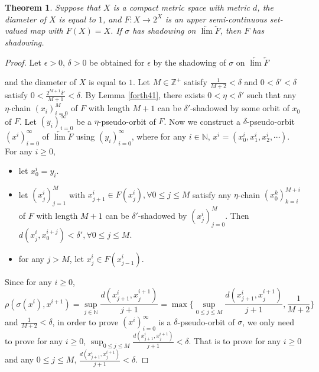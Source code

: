 \documentclass[12pt]{amsart}
\newtheorem{theorem}{Theorem}[section]
\theoremstyle{definition}
\begin{document}
\begin{theorem}\label{thm2}
	Suppose that $X$ is a compact metric space with metric $d$, the diameter of $X$ is equal to $1$, and $F:X\rightarrow 2^X$ is an upper semi-continuous set-valued map with $F(X)=X$. If $\sigma$ has shadowing on $\underleftarrow{\lim} \underleftarrow{F}$, then $F$ has shadowing.
\end{theorem}
\begin{proof}
	Let $\epsilon>0$, $\delta>0$ be obtained for $\epsilon$ by the shadowing of $\sigma$ on $\underleftarrow{\lim} \underleftarrow{F}$ {and the diameter of $X$ is equal to $1$. Let $M\in\mathbb{Z^+}$ satisfy $\frac{1}{M+2}<\delta$ and $0<\delta'<\delta$ satisfy $0<\frac{2^{M+1}\delta'}{M+1}<\delta$. By Lemma \ref{forth41}, there exists $0<\eta<\delta'$ such that any $\eta$-chain $(x_i)_{i=0}^M$ of $F$ with length $M+1$ can be $\delta'$-shadowed by some orbit of $x_0$ of $F$.
		Let $(y_i)_{i=0}^\infty$ be a $\eta$-pseudo-orbit of $F$. Now we construct a $\delta$-pseudo-orbit $(x^i)_{i=0}^\infty$ of $\underleftarrow{\lim} \underleftarrow{F}$ using $(y_i)_{i=0}^\infty$, where for any $i\in\mathbb{N}$, $x^i=(x^i_0, x^i_1, x^i_2, \cdots).$ For any $i\geq0$,
		\begin{itemize}
			\item [(1)]let $x_0^i=y_i$.
			\item [(2)]let $(x^i_j)_{j=1}^M$ with $x_{j+1}^i\in F(x_j^i),\forall 0\leq j\leq M$ satisfy any $\eta$-chain  $(x_{0}^k)_{k=i}^{M+i}$ of $F$ with length $M+1$ can be $\delta'$-shadowed by $(x_j^i)_{j=0}^M$. Then $d(x_j^i,x_0^{i+j})<\delta',\forall 0\leq j\leq M$.
			\item[(3)]for any $j>M$, let $x_j^i\in F(x_{j-1}^i)$. 
		\end{itemize}
		Since for any $i\geq 0$, $$\rho(\sigma(x^i),x^{i+1})=\sup_{j\in\mathbb{N}}\frac{d(x_{j+1}^i,x_j^{i+1})}{j+1}=\max\{\sup_{0\leq j\leq M}\frac{d(x_{j+1}^i,x_j^{i+1})}{j+1},\frac{1}{M+2}\}$$
		and $\frac{1}{M+2}<\delta$, in order to prove $(x^i)_{i=0}^\infty$ is a $\delta$-pseudo-orbit of $\sigma$, we only need to prove for any $i\geq 0$, $\sup_{0\leq j\leq M}\frac{d(x_{j+1}^i,x_j^{i+1})}{j+1}<\delta$. That is to prove for any $i\geq 0$ and any $0\leq j\leq M$, $\frac{d(x_{j+1}^i,x_j^{i+1})}{j+1}<\delta$.}
	

\end{proof}
\end{document}
